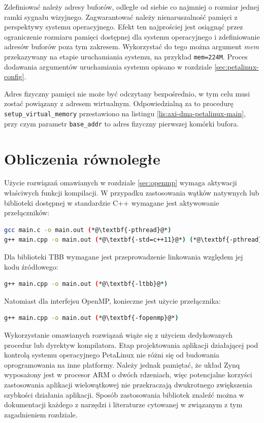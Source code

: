 Zdefiniować należy adresy buforów, odległe od siebie co najmniej o rozmiar jednej ramki sygnału wizyjnego. 
Zagwarantować należy nienaruszalność pamięci z perspektywy systemu operacyjnego. 
Efekt ten najprościej jest osiągnąć przez ograniczenie rozmiaru pamięci dostępnej dla systemu operacyjnego i zdefiniowanie adresów buforów poza tym zakresem. 
Wykorzystać do tego można argument \textit{mem} przekazywany na etapie uruchamiania systemu, na przykład \texttt{mem=224M}. 
Proces dodawania argumentów uruchamiania systemu opisano w rozdziale \ref{sec:petalinux-config}. 

Adres fizyczny pamięci nie może być odczytany bezpośrednio, w tym celu musi zostać powiązany z adresem wirtualnym. 
Odpowiedzialną za to procedurę \texttt{setup\_virtual\_memory} przestawiono na listingu \ref{lis:axi-dma-petalinux-main}, przy czym parametr \texttt{base\_addr} to adres fizyczny pierwszej komórki bufora. 

\section{Obliczenia równoległe}
\label{sec:multithreading-config}
Użycie rozwiązań omawianych w rozdziale \ref{sec:openmp} wymaga aktywacji właściwych funkcji kompilacji.
W przypadku zastosowania wątków natywnych lub biblioteki dostępnej w standardzie C++ wymagane jest aktywowanie przełączników: 

\begin{lstlisting}[language=bash]
gcc main.c -o main.out (*@\textbf{-pthread}@*)
g++ main.cpp -o main.out (*@\textbf{-std=c++11}@*) (*@\textbf{-pthread}@*)
\end{lstlisting}

Dla biblioteki TBB wymagane jest przeprowadzenie linkowania względem jej kodu źródłowego:

\begin{lstlisting}[language=bash]
g++ main.cpp -o main.out (*@\textbf{-ltbb}@*)
\end{lstlisting}

Natomiast dla interfejsu OpenMP, konieczne jest użycie przełącznika:

\begin{lstlisting}[language=bash]
g++ main.cpp -o main.out (*@\textbf{-fopenmp}@*)
\end{lstlisting}

Wykorzystanie omawianych rozwiązań wiąże się z użyciem dedykowanych procedur lub dyrektyw kompilatora. 
Etap projektowania aplikacji działającej pod kontrolą systemu operacyjnego PetaLinux nie różni się od budowania oprogramowania na inne platformy. Należy jednak pamiętać, że układ Zynq wyposażony jest w procesor ARM o dwóch rdzeniach, więc potencjalne korzyści zastosowania aplikacji wielowątkowej nie przekraczają dwukrotnego zwiększenia szybkości działania aplikacji.
Sposób zastosowania bibliotek znaleźć można w dokumentacji każdego z narzędzi i literaturze cytowanej w związanym z tym zagadnieniem rozdziale.

